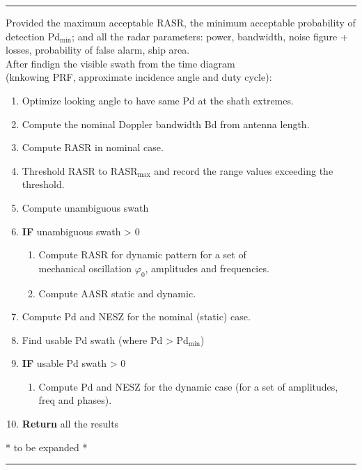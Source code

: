 \documentclass[11pt, a4paper]{scrartcl}
\begin{document}
    \FloatBarrier
    \noindent\rule{\textwidth}{0.4pt}
    \begin{ttfamily}
        \small
        Provided the maximum acceptable RASR, the minimum acceptable probability of detection Pd$_{\text{min}}$;
        and all the radar parameters: power, bandwidth, noise figure + losses, probability of false alarm, ship area.\\
        After findign the visible swath from the time diagram \\(knkowing PRF, approximate incidence angle and duty cycle):
        \begin{enumerate}
            \item Optimize looking angle to have same Pd at the shath extremes.
            \item Compute the nominal Doppler bandwidth Bd from antenna length.
            \item Compute RASR in nominal case.
            \item Threshold RASR to RASR$_{\text{max}}$ and record the range values exceeding the threshold.
            \item Compute unambiguous swath
            \item \textbf{IF} unambiguous swath > 0
            \begin{enumerate}
                \item Compute RASR for dynamic pattern for a set of \\mechanical oscillation $\varphi_0$, amplitudes and frequencies.
                \item Compute AASR static and dynamic.
            \end{enumerate}
            \item Compute Pd and NESZ for the nominal (static) case.
            \item Find usable Pd swath (where Pd > Pd$_{\text{min}}$)
            \item \textbf{IF} usable Pd swath > 0
            \begin{enumerate}
                \item Compute Pd and NESZ for the dynamic case (for a set of amplitudes, freq and phases).
            \end{enumerate}
            \item \textbf{Return} all the results
        \end{enumerate}
    \end{ttfamily}

    * to be expanded *\\
    \noindent\rule{\textwidth}{0.4pt}
\end{document}
